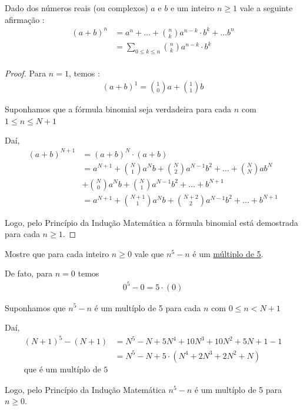     \begin{proposicao}
        Dado dos números reais (ou complexos) $a$ e $b$ e um inteiro $n \ge 1$ vale a seguinte afirmação :
        \begin{align*}
            (a+b)^n &= a^n + \dotsc + \binom{n}{k}a^{n-k} \cdot b^{k} + \dotsc b^n\\
            &= \sum_{0 \leq k \leq n}^{} \binom{n}{k}a^{n-k} \cdot b^{k}\\
        \end{align*}

        \begin{proof}
            Para $n=1$, temos :
            \begin{align*}
                (a+b)^1 = \binom{1}{0}a + \binom{1}{1}b 
            \end{align*}

            Suponhamos que a fórmula binomial seja verdadeira para cada $n$ com $1 \leq n \leq N+1$

            Daí,
            \begin{align*}
                (a+b)^{N+1} &= (a+b)^{N} \cdot (a+b) \\ 
                &= a^{N+1} + \binom{N}{1}a^{N}b + \binom{N}{2}a^{N-1}b^2 + \dotsc + \binom{N}{N}ab^{N} \\
                &+ \binom{N}{0}a^{N}b + \binom{N}{1}a^{N-1}b^2 + \dotsc + b^{N+1} \\
                &= a^{N+1} + \binom{N+1}{1}a^{N}b + \binom{N+2}{2}a^{N-1}b^2 + \dotsc + b^{N+1}
            \end{align*}

            Logo, pelo Princípio da Indução Matemática a fórmula binomial está demostrada para cada $n \ge 1$.
        \end{proof}
    
    \end{proposicao}
    
    \begin{exemplo}
        Mostre que para cada inteiro $n \ge 0$ vale que $n^5 - n$ é um \underline{múltiplo de 5}.
        
        De fato, para $n = 0$ temos
        \begin{align*}
            0^5 - 0 = 5 \cdot (0)
        \end{align*}

        Suponhamos que $n^5 - n$ é um multíplo de 5 para cada $n$ com $0 \leq n < N+1$

        Daí,
        \begin{align*}
            (N+1)^5 - (N+1) &= N^5 - N + 5N^4 + 10N^3 + 10N^2 + 5N + 1 - 1 \\
            &= N^5 - N + 5 \cdot (N^4 + 2N^3 + 2N^2 + N) \\
            \text{que é um multíplo de 5}
        \end{align*}

        Logo, pelo Princípio da Indução Matemática $n^5 - n$ é um multíplo de 5 para $n \ge 0$. 

    \end{exemplo}
